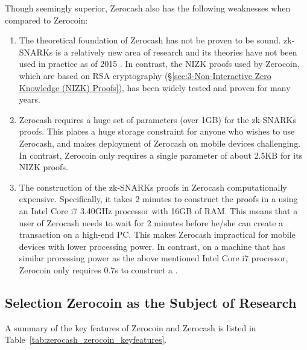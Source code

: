 Though seemingly superior, Zerocash also has the following weaknesses when compared to Zerocoin:

\begin{enumerate}
	\item The theoretical foundation of Zerocash has not be proven to be sound. zk-SNARKs is a relatively new area of research and its theories have not been used in practice as of 2015 \cite{narayanan2016bitcoin}. In contrast, the NIZK proofs used by Zerocoin, which are based on RSA cryptography (\S\ref{sec:3-Non-Interactive Zero Knowledge (NIZK) Proofs}), has been widely tested and proven for many years. 
	\item Zerocash requires a huge set of parameters (over 1GB) for the zk-SNARKs proofs. This places a huge storage constraint for anyone who wishes to use Zerocash, and makes deployment of Zerocash on mobile devices challenging. In contrast, Zerocoin only requires a single parameter of about 2.5KB for its NIZK proofs.
	\item The construction of the zk-SNARKs proofs in Zerocash computationally expensive. Specifically, it takes 2 minutes to construct the proofs in a  using an Intel Core i7 3.40GHz processor with 16GB of RAM. This means that a user of Zerocash needs to wait for 2 minutes before he/she can create a transaction on a high-end PC. This makes Zerocash impractical for mobile devices with lower processing power. In contrast, on a machine that has similar processing power as the above mentioned Intel Core i7 processor, Zerocoin only requires 0.7s to construct a .
\end{enumerate}

\subsection{Selection Zerocoin as the Subject of Research}
\label{sec:2-Selection Zerocoin as the Subject of Research}
A summary of the key features of Zerocoin and Zerocash is listed in Table~\ref{tab:zerocash_zerocoin_keyfeatures}.

